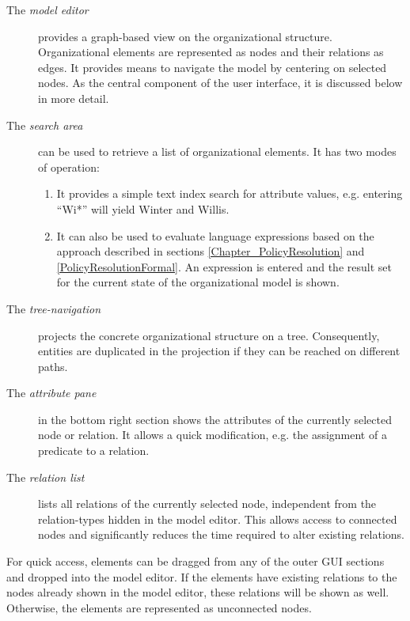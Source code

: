 \begin{description}
  \item[The \emph{model editor}] provides a graph-based view on the organizational structure. Organizational elements are represented as nodes and their relations as edges. It provides means to navigate the model by centering on selected nodes. As the central component of the user interface, it is discussed below in more detail.
	\item[The \emph{search area}] can be used to retrieve a list of organizational elements. It has two modes of operation:
	  \begin{enumerate}
		  \item It provides a simple text index search for attribute values, e.g. entering ``Wi*'' will yield Winter and Willis.
			\item It can also be used to evaluate language expressions based on the approach described in sections \ref{Chapter_PolicyResolution} and \ref{PolicyResolutionFormal}. An expression is entered and the result set for the current state of the organizational model is shown.
		\end{enumerate}
	\item[The \emph{tree-navigation}] projects the concrete organizational structure on a tree. Consequently, entities are duplicated in the projection if they can be reached on different paths.
	\item[The \emph{attribute pane}] in the bottom right section shows the attributes of the currently selected node or relation. It allows a quick modification, e.g. the assignment of a predicate to a relation.
	\item[The \emph{relation list}] lists all relations of the currently selected node, independent from the relation-types hidden in the model editor. This allows access to connected nodes and significantly reduces the time required to alter existing relations.
\end{description}

For quick access, elements can be dragged from any of the outer GUI sections and dropped into the model editor. If the elements have existing relations to the nodes already shown in the model editor, these relations will be shown as well. Otherwise, the elements are represented as unconnected nodes.


